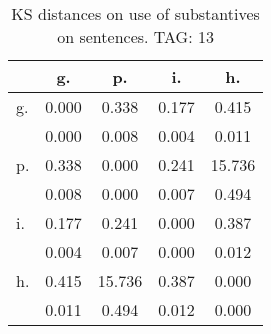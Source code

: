 \begin{table}[h!]
\begin{center}
\begin{tabular}{| l | c | c | c | c |}\hline
 & g. & p. & i. & h. \\\hline
g. & 0.000  & 0.338  & 0.177  & 0.415 \\\hline
 & 0.000  & 0.008  & 0.004  & 0.011 \\\hline
p. & 0.338  & 0.000  & 0.241  & 15.736 \\\hline
 & 0.008  & 0.000  & 0.007  & 0.494 \\\hline
i. & 0.177  & 0.241  & 0.000  & 0.387 \\\hline
 & 0.004  & 0.007  & 0.000  & 0.012 \\\hline
h. & 0.415  & 15.736  & 0.387  & 0.000 \\\hline
 & 0.011  & 0.494  & 0.012  & 0.000 \\\hline
\end{tabular}
\caption{KS distances on use of substantives on sentences. TAG: 13}
\end{center}
\end{table}